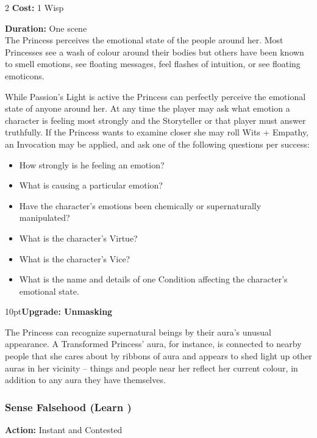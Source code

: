 \begin{multicols}{2}
\noindent \textbf{Cost:} 1 Wisp

\noindent \textbf{Duration:} One scene \\

\noindent The Princess perceives the emotional state of the people around her. Most Princesses see a wash of colour around their bodies but others have been known to smell emotions, see floating messages, feel flashes of intuition, or see floating emoticons. 

While Passion's Light is active the Princess can perfectly perceive the emotional state of anyone around her. At any time the player may ask what emotion a character is feeling most strongly and the Storyteller or that player must answer truthfully. If the Princess wants to examine closer she may roll Wits + Empathy, an Invocation may be applied, and ask one of the following questions per success: 

\begin{itemize}
 \item How strongly is he feeling an emotion? 
 \item What is causing a particular emotion? 
 \item Have the character’s emotions been chemically or supernaturally manipulated? 
 \item What is the character’s Virtue?
 \item What is the character’s Vice?
 \item What is the name and details of one Condition affecting the character’s emotional state. 
\end{itemize}

\begin{myindentpar}{10pt}\textbf{Upgrade: Unmasking}

The Princess can recognize supernatural beings by their aura's unusual appearance. A Transformed Princess' aura, for instance, is connected to nearby people that she cares about by ribbons of aura and appears to shed light up other auras in her vicinity -- things and people near her reflect her current colour, in addition to any aura they have themselves. \end{myindentpar}

\subsubsection*{Sense Falsehood (Learn \textbullet)}

\noindent \textbf{Action:} Instant and Contested


\end{multicols}
